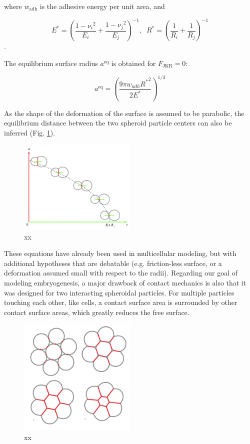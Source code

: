 where $w_{\mathrm{adh}}$ is the adhesive energy per unit area, and

$$E^{*} = \left(     \frac{1-{\nu_i}^2}{E_i} + \frac{1-{\nu_j}^2}{E_j}   \right)^{-1},\;\; R^{*} = \left(     \frac{1}{R_i} + \frac{1}{R_j}   \right)^{-1}$$.

The equilibrium surface radius $a^{\mathrm{eq}}$ is obtained for $F_{\mathrm{JKR}} = 0$:

$$ a^{\mathrm{eq}} = \left( \frac{9 \pi w_{adh} {R^{*}}^2}{2 E^{*}} \right)^{1/3} $$

As the shape of the deformation of the surface is assumed to be parabolic, the equilibrium distance between the two spheroid particle centers can also be inferred (Fig. \ref{Contact_mechanics_two_cells_contact}).
\begin{figure}
\begin{center}
\includegraphics[width=0.5\textwidth]{../../images/Contact_mechanics/two_cells_contact.png}
\end{center}
\caption{xx}
\label{Contact_mechanics_two_cells_contact}
\end{figure}

These equations have already been used in multicellular modeling, but with additional hypotheses that are debatable (e.g. friction-less surface, or a deformation assumed small with respect to the radii). Regarding our goal of modeling embryogenesis, a major drawback of contact mechanics is also that it was designed for two interacting spheroidal particles. For multiple particles touching each other, like cells, a contact surface area is surrounded by other contact surface areas, which greatly reduces the free surface.
\begin{figure}
\begin{center}
\includegraphics[width=0.5\textwidth]{../../images/Contact_mechanics/multi_cells_contact.png}
\end{center}
\caption{xx}
\label{Contact_mechanics_multi_cells_contact}
\end{figure}

